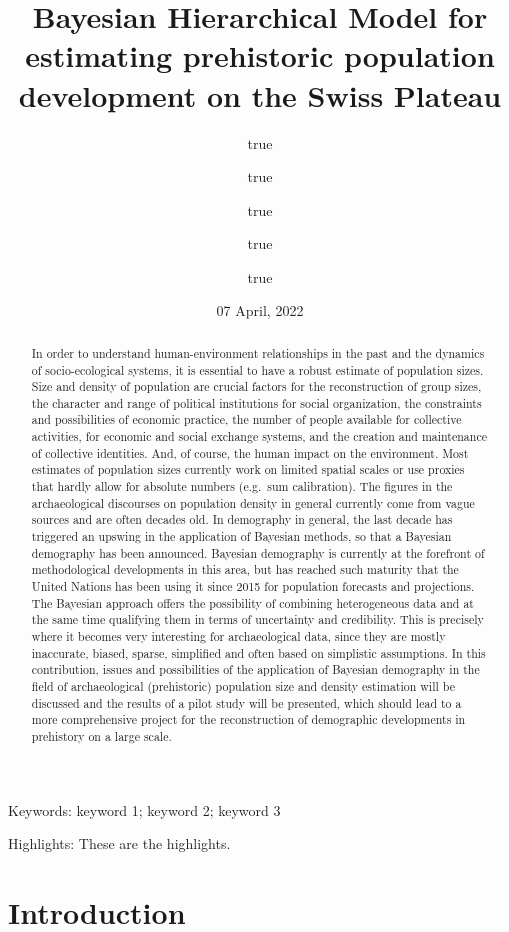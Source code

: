 \documentclass[
]{article}
\title{Bayesian Hierarchical Model for estimating prehistoric population development on the Swiss Plateau}
\author{true \and true \and true \and true \and true}
\date{07 April, 2022}
\begin{document}
\maketitle
\begin{abstract}
In order to understand human-environment relationships in the past and the dynamics of socio-ecological systems, it is essential to have a robust estimate of population sizes. Size and density of population are crucial factors for the reconstruction of group sizes, the character and range of political institutions for social organization, the constraints and possibilities of economic practice, the number of people available for collective activities, for economic and social exchange systems, and the creation and maintenance of collective identities. And, of course, the human impact on the environment. Most estimates of population sizes currently work on limited spatial scales or use proxies that hardly allow for absolute numbers (e.g.~sum calibration). The figures in the archaeological discourses on population density in general currently come from vague sources and are often decades old.
In demography in general, the last decade has triggered an upswing in the application of Bayesian methods, so that a Bayesian demography has been announced. Bayesian demography is currently at the forefront of methodological developments in this area, but has reached such maturity that the United Nations has been using it since 2015 for population forecasts and projections. The Bayesian approach offers the possibility of combining heterogeneous data and at the same time qualifying them in terms of uncertainty and credibility. This is precisely where it becomes very interesting for archaeological data, since they are mostly inaccurate, biased, sparse, simplified and often based on simplistic assumptions.
In this contribution, issues and possibilities of the application of Bayesian demography in the field of archaeological (prehistoric) population size and density estimation will be discussed and the results of a pilot study will be presented, which should lead to a more comprehensive project for the reconstruction of demographic developments in prehistory on a large scale.
\end{abstract}

{
\setcounter{tocdepth}{2}
\tableofcontents
}
Keywords: keyword 1; keyword 2; keyword 3

Highlights: These are the highlights.

\hypertarget{introduction}{%
\section{Introduction}\label{introduction}}
\end{document}
